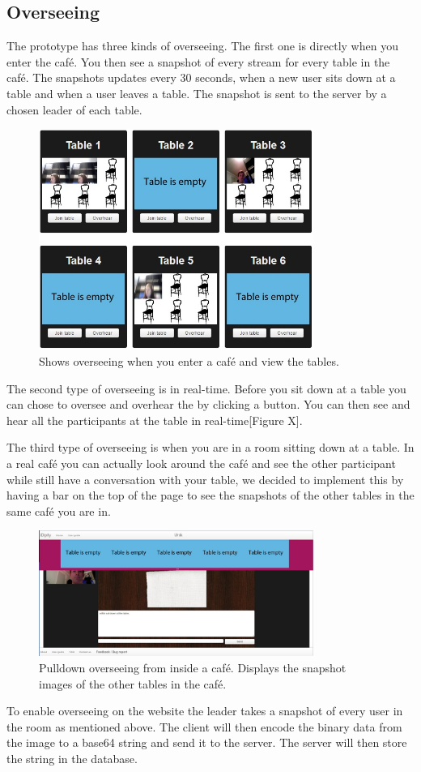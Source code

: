 \documentclass[12pt, titlepage]{article}
\begin{document}
\subsection{Overseeing}
The prototype has three kinds of overseeing. The first one is directly when you enter the café. You then see a snapshot of every stream for every table in the café. The snapshots updates every 30 seconds, when a new user sits down at a table and when a user leaves a table. The snapshot is sent to the server by a chosen leader of each table.
\begin{figure}[H]
  \centering
	\includegraphics[width=0.8\textwidth,keepaspectratio]{overseeing2D.jpg}
  \caption{Shows overseeing when you enter a café and view the tables.}
\end{figure}
The second type of overseeing is in real-time. Before you sit down at a table you can chose to oversee and overhear the by clicking a button. You can then see and hear all the participants at the table in real-time[Figure X].

The third type of overseeing is when you are in a room sitting down at a table. In a real café you can actually look around the café and see the other participant while still have a conversation with your table, we decided to implement this by having a bar on the top of the page  to see the snapshots of the other tables in the same café you are in.
\begin{figure}[H]
  \centering
	\includegraphics[width=0.8\textwidth,keepaspectratio]{pulldownoversee.jpg}
  \caption{Pulldown overseeing from inside a café. Displays the snapshot images of the other tables in the café.}
\end{figure}
To enable overseeing on the website the leader takes a snapshot of every user in the room as mentioned above. The client will then encode the binary data from the image to a base64 string and send it to the server. The server will then store the string in the database.
\end{document}
